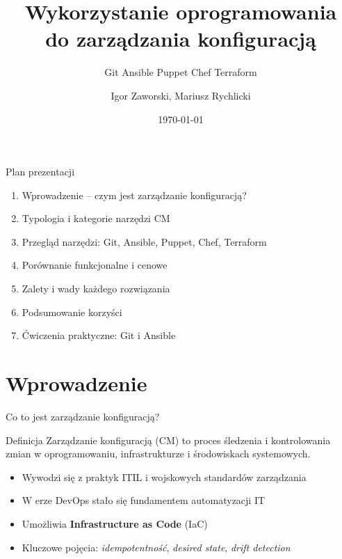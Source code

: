 \documentclass{beamer}
\title{Wykorzystanie oprogramowania\\do zarz\k{a}dzania konfiguracj\k{a}}
\subtitle{Git \textbar{} Ansible \textbar{} Puppet \textbar{} Chef \textbar{} Terraform}
\author{Igor Zaworski, Mariusz Rychlicki}
\date{\today}
\begin{document}
\begin{frame}
    \titlepage
\end{frame}

\begin{frame}{Plan prezentacji}
    \begin{enumerate}
        \item Wprowadzenie -- czym jest zarz\k{a}dzanie konfiguracj\k{a}?
        \item Typologia i kategorie narz\k{e}dzi CM
        \item Przegl\k{a}d narz\k{e}dzi: Git, Ansible, Puppet, Chef, Terraform
        \item Por\'ownanie funkcjonalne i cenowe
        \item Zalety i wady ka\.zdego rozwi\k{a}zania
        \item Podsumowanie korzy\'sci
        \item \'{C}wiczenia praktyczne: Git i Ansible
    \end{enumerate}
\end{frame}

\section{Wprowadzenie}

\begin{frame}{Co to jest zarz\k{a}dzanie konfiguracj\k{a}?}
    \begin{block}{Definicja}
        Zarz\k{a}dzanie konfiguracj\k{a} (CM) to proces \'{s}ledzenia i kontrolowania zmian
        w oprogramowaniu, infrastrukturze i \'{s}rodowiskach systemowych.
    \end{block}
    \vspace{0.5em}
    \begin{itemize}
        \item Wywodzi si\k{e} z praktyk ITIL i wojskowych standard\'ow zarz\k{a}dzania
        \item W erze DevOps sta\l{}o si\k{e} fundamentem automatyzacji IT
        \item Umo\.zliwia \textbf{Infrastructure as Code} (IaC)
        \item Kluczowe poj\k{e}cia: \textit{idempotentno\'s\'c}, \textit{desired state}, \textit{drift detection}
    \end{itemize}
    \vspace{0.5em}
\end{frame}
\end{document}
